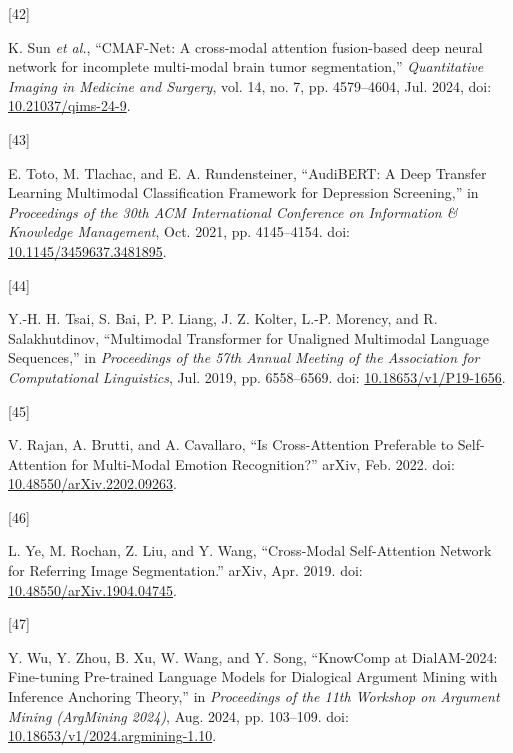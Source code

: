 \documentclass[twocolumn]{article}
\newlength{\cslhangindent}
\newlength{\csllabelwidth}
\newenvironment{CSLReferences}[2] %
 {\begin{list}{}{%
  \setlength{\itemindent}{0pt}
  \setlength{\leftmargin}{0pt}
  \setlength{\parsep}{0pt}
  \ifodd #1
   \setlength{\leftmargin}{\cslhangindent}
   \setlength{\itemindent}{-1\cslhangindent}
  \fi
  \setlength{\itemsep}{#2\baselineskip}}}
 {\end{list}}
\newcommand{\CSLLeftMargin}[1]{\parbox[t]{\csllabelwidth}{\strut#1\strut}}
\newcommand{\CSLRightInline}[1]{\parbox[t]{\linewidth - \csllabelwidth}{\strut#1\strut}}
\begin{document}
\begin{CSLReferences}{0}{0}
\CSLLeftMargin{{[}42{]} }%
\CSLRightInline{K. Sun \emph{et al.}, {``{CMAF-Net}: A cross-modal
attention fusion-based deep neural network for incomplete multi-modal
brain tumor segmentation,''} \emph{Quantitative Imaging in Medicine and
Surgery}, vol. 14, no. 7, pp. 4579--4604, Jul. 2024, doi:
\href{https://doi.org/10.21037/qims-24-9}{10.21037/qims-24-9}.}

\CSLLeftMargin{{[}43{]} }%
\CSLRightInline{E. Toto, M. Tlachac, and E. A. Rundensteiner,
{``{AudiBERT}: {A Deep Transfer Learning Multimodal Classification
Framework} for {Depression Screening},''} in \emph{Proceedings of the
30th {ACM International Conference} on {Information} \& {Knowledge
Management}}, Oct. 2021, pp. 4145--4154. doi:
\href{https://doi.org/10.1145/3459637.3481895}{10.1145/3459637.3481895}.}

\CSLLeftMargin{{[}44{]} }%
\CSLRightInline{Y.-H. H. Tsai, S. Bai, P. P. Liang, J. Z. Kolter, L.-P.
Morency, and R. Salakhutdinov, {``Multimodal {Transformer} for
{Unaligned Multimodal Language Sequences},''} in \emph{Proceedings of
the 57th {Annual Meeting} of the {Association} for {Computational
Linguistics}}, Jul. 2019, pp. 6558--6569. doi:
\href{https://doi.org/10.18653/v1/P19-1656}{10.18653/v1/P19-1656}.}

\CSLLeftMargin{{[}45{]} }%
\CSLRightInline{V. Rajan, A. Brutti, and A. Cavallaro, {``Is
{Cross-Attention Preferable} to {Self-Attention} for {Multi-Modal
Emotion Recognition}?''} arXiv, Feb. 2022. doi:
\href{https://doi.org/10.48550/arXiv.2202.09263}{10.48550/arXiv.2202.09263}.}

\CSLLeftMargin{{[}46{]} }%
\CSLRightInline{L. Ye, M. Rochan, Z. Liu, and Y. Wang, {``Cross-{Modal
Self-Attention Network} for {Referring Image Segmentation}.''} arXiv,
Apr. 2019. doi:
\href{https://doi.org/10.48550/arXiv.1904.04745}{10.48550/arXiv.1904.04745}.}

\CSLLeftMargin{{[}47{]} }%
\CSLRightInline{Y. Wu, Y. Zhou, B. Xu, W. Wang, and Y. Song,
{``{KnowComp} at {DialAM-2024}: {Fine-tuning Pre-trained Language
Models} for {Dialogical Argument Mining} with {Inference Anchoring
Theory},''} in \emph{Proceedings of the 11th {Workshop} on {Argument
Mining} ({ArgMining} 2024)}, Aug. 2024, pp. 103--109. doi:
\href{https://doi.org/10.18653/v1/2024.argmining-1.10}{10.18653/v1/2024.argmining-1.10}.}


\end{CSLReferences}
\end{document}
